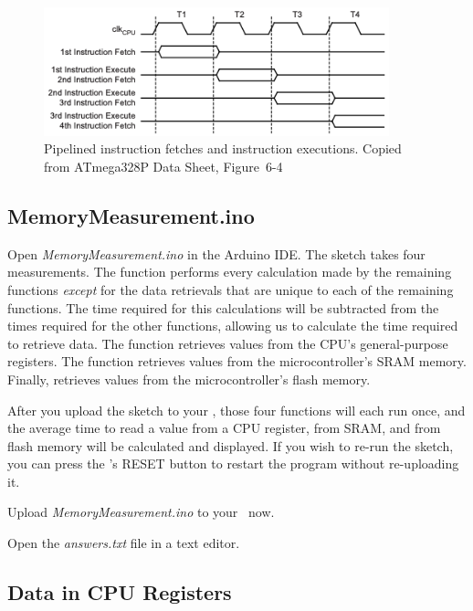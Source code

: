 \begin{figure}
    \centering
    \includegraphics[width=10cm]{ATmega328P_PipelineTiming}
    \caption{Pipelined instruction fetches and instruction executions. \tiny Copied from ATmega328P Data Sheet, Figure~6-4 \label{fig:pipelining}}
\end{figure}

\subsection{MemoryMeasurement.ino}

Open \textit{MemoryMeasurement.ino} in the Arduino IDE. The sketch takes four
measurements. The  function performs every
calculation made by the remaining functions \textit{except} for the data
retrievals that are unique to each of the remaining functions. The time
required for this calculations will be subtracted from the times required for
the other functions, allowing us to calculate the time required to retrieve
data. The  function retrieves values from the
CPU's general-purpose registers. The  function
retrieves values from the microcontroller's SRAM memory. Finally,
 retrieves values from the microcontroller's
flash memory.

After you upload the sketch to your \nano, those four functions will each run
once, and the average time to read a value from a CPU register, from SRAM, and
from flash memory will be calculated and displayed. If you wish to re-run the
sketch, you can press the \nano's RESET button to restart the program without
re-uploading it.

Upload \textit{MemoryMeasurement.ino} to your \nano\ now.

\vspace{.5cm}

Open the \textit{answers.txt} file in a text editor.

\subsection{Data in CPU Registers}

